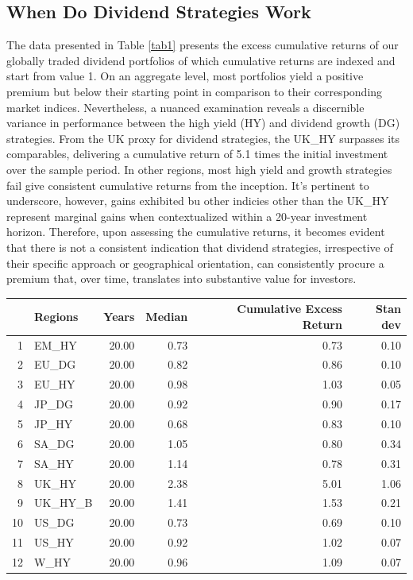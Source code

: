 \documentclass[10pt,preprint, authoryear]{elsarticle}
\let\origtable\table
\let\endorigtable\endtable
\renewenvironment{table}[1][2] {
    \expandafter\origtable\expandafter[H]
} {
    \endorigtable
}
\numberwithin{equation}{section}
\numberwithin{figure}{section}
\numberwithin{table}{section}
\begin{document}
\hypertarget{when-do-dividend-strategies-work}{%
\subsection*{When Do Dividend Strategies
Work}\label{when-do-dividend-strategies-work}}

The data presented in Table \ref{tab1} presents the excess cumulative
returns of our globally traded dividend portfolios of which cumulative
returns are indexed and start from value 1. On an aggregate level, most
portfolios yield a positive premium but below their starting point in
comparison to their corresponding market indices. Nevertheless, a
nuanced examination reveals a discernible variance in performance
between the high yield (HY) and dividend growth (DG) strategies. From
the UK proxy for dividend strategies, the UK\_HY surpasses its
comparables, delivering a cumulative return of 5.1 times the initial
investment over the sample period. In other regions, most high yield and
growth strategies fail give consistent cumulative returns from the
inception. It's pertinent to underscore, however, gains exhibited bu
other indicies other than the UK\_HY represent marginal gains when
contextualized within a 20-year investment horizon. Therefore, upon
assessing the cumulative returns, it becomes evident that there is not a
consistent indication that dividend strategies, irrespective of their
specific approach or geographical orientation, can consistently procure
a premium that, over time, translates into substantive value for
investors.

\begin{table}[H]
\centering
\begin{tabular}{rlrrrr}
  \hline
 & Regions & Years & Median & Cumulative Excess Return & Stan dev \\ 
  \hline
1 & EM\_HY & 20.00 & 0.73 & 0.73 & 0.10 \\ 
  2 & EU\_DG & 20.00 & 0.82 & 0.86 & 0.10 \\ 
  3 & EU\_HY & 20.00 & 0.98 & 1.03 & 0.05 \\ 
  4 & JP\_DG & 20.00 & 0.92 & 0.90 & 0.17 \\ 
  5 & JP\_HY & 20.00 & 0.68 & 0.83 & 0.10 \\ 
  6 & SA\_DG & 20.00 & 1.05 & 0.80 & 0.34 \\ 
  7 & SA\_HY & 20.00 & 1.14 & 0.78 & 0.31 \\ 
  8 & UK\_HY & 20.00 & 2.38 & 5.01 & 1.06 \\ 
  9 & UK\_HY\_B & 20.00 & 1.41 & 1.53 & 0.21 \\ 
  10 & US\_DG & 20.00 & 0.73 & 0.69 & 0.10 \\ 
  11 & US\_HY & 20.00 & 0.92 & 1.02 & 0.07 \\ 
  12 & W\_HY & 20.00 & 0.96 & 1.09 & 0.07 \\ 
   \hline
\end{tabular}
\caption{Cumulative Excess Return \label{tab1}} 
\end{table}
\end{document}
